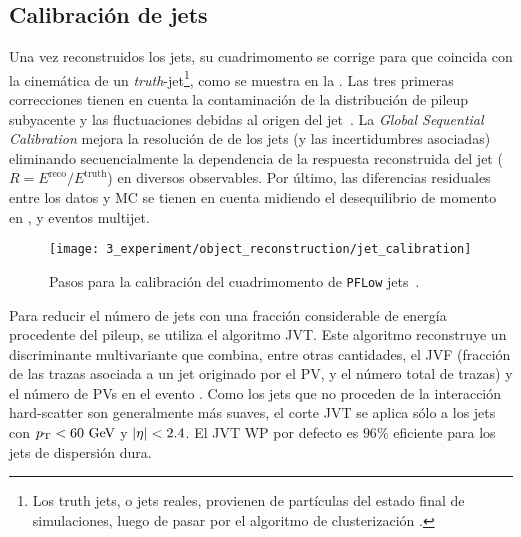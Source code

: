 \subsection{Calibraci\'on de jets}

Una vez reconstruidos los jets, su cuadrimomento se corrige para que coincida con la cinemática de un \textit{truth}-jet\footnote{Los truth jets, o jets reales, provienen de part\'iculas del estado final de simulaciones, luego de pasar por el algoritmo de clusterizaci\'on \antikt.}, como se muestra en la \Fig{\ref{fig:objects:jets:jet_calib:jet_calib_sequence}}. Las tres primeras correcciones tienen en cuenta la contaminación de la distribución de pileup subyacente y las fluctuaciones debidas al origen del jet~\cite{ATLAS-Jet-Calibration-Run2}. La \textit{Global Sequential Calibration} mejora la resolución de \pt de los jets (y las incertidumbres asociadas) eliminando secuencialmente la dependencia de la respuesta reconstruida del jet (\(R= E^{\text{reco}} / E^{\text{truth}}\)) en diversos observables. Por último, las diferencias residuales entre los datos y \ac{MC} se tienen en cuenta midiendo el desequilibrio de momento en \Zjets, \gammajet y eventos multijet.

\begin{figure}[ht!]
    \centering
    \texttt{[image: 3\_experiment/object\_reconstruction/jet\_calibration]}
    \caption{Pasos para la calibraci\'on del cuadrimomento de \texttt{PFLow} jets~\cite{ATLAS-Jet-Calibration-Run2}.}
    \label{fig:objects:jets:jet_calib:jet_calib_sequence}
\end{figure}

Para reducir el número de jets con una fracción considerable de energía procedente del pileup, se utiliza el algoritmo \ac{JVT}. Este algoritmo  reconstruye un discriminante multivariante que combina, entre otras cantidades, el \ac{JVF} (fracción de las trazas \pt asociada a un jet originado por el \ac{PV}, y el número total de trazas) y el número de \acp{PV} en el evento \Npv. Como los jets que no proceden de la interacción hard-scatter son generalmente más suaves, el corte \ac{JVT} se aplica sólo a los jets con \(p_{\text{T}}<60~\text{GeV}\) y \(|\eta|<2.4\). El \ac{JVT} \ac{WP} por defecto es \(96\%\) eficiente para los jets de dispersión dura.


















